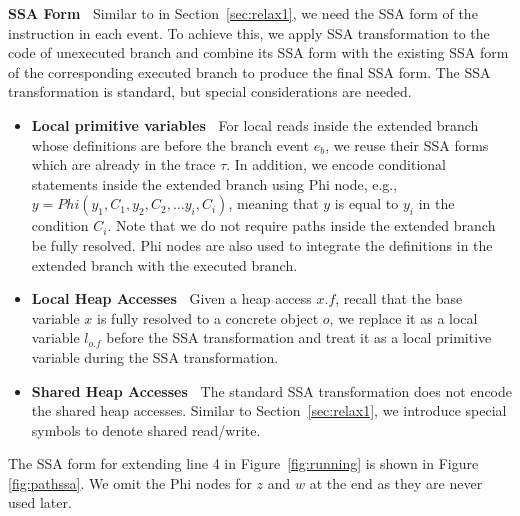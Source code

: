 {\bf SSA Form\ }  Similar to in Section~\ref{sec:relax1}, we need the SSA 
form of the instruction in each event. To achieve this, we apply SSA 
transformation to the code of unexecuted branch and combine its SSA form 
with the existing SSA form of the corresponding executed branch to produce the final 
SSA form. The SSA transformation is standard, but special considerations
are needed.
\begin{itemize}
\item {\bf Local primitive variables\ }  
For local reads inside the extended branch whose definitions are
before the branch event $e_b$, we reuse their SSA forms which 
are already in the trace $\tau$.
In addition, 
we encode conditional statements inside the extended branch using
Phi node, e.g., $y=Phi(y_1, C_1, y_2, C_2, \dots y_i, C_i)$, 
meaning that $y$ is equal to $y_i$ in the condition $C_i$.
Note that we do not require paths inside the extended branch be fully
resolved. 
Phi nodes are also used to integrate the definitions in the extended
branch with the executed branch.

\item {\bf Local Heap Accesses\ } Given a heap access  $x.f$, 
recall that the base variable $x$ is fully resolved to a concrete object
 $o$, we replace it as a local variable $l_{o.f}$ before the SSA 
transformation and treat it as a local primitive variable during the 
SSA transformation.
 
\item {\bf Shared Heap Accesses\ } The standard SSA transformation 
does not encode the shared heap accesses. Similar to 
Section~\ref{sec:relax1}, we introduce special symbols to 
denote shared read/write.
\end{itemize}

The SSA form for extending line 4 in Figure~\ref{fig:running}  is shown 
in Figure \ref{fig:pathssa}. We omit the Phi nodes for $z$ and $w$ at 
the end as they are never used later. 


